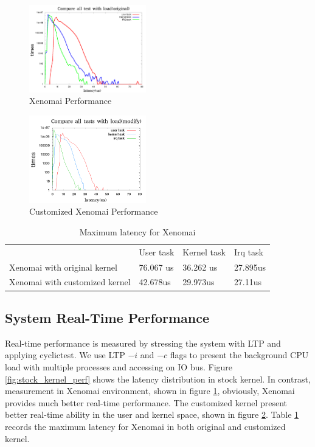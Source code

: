 \documentclass[conference]{IEEEtran}
\begin{document}
\begin{figure}	
	\centering
	\includegraphics[width=2in]{img/xenomai_load.png}
	\caption{Xenomai Performance}
	\label{fig:xeno_perf}
\end{figure}

\begin{figure}
	\centering
	\includegraphics[width=2in]{img/xenomai_load_modify.png}
	\caption{Customized Xenomai Performance}
	\label{fig:xeno_perf_modify}
\end{figure}

\begin{table}[]
\centering
\caption{Maximum latency for Xenomai}
\label{xeno_compare}
\begin{tabular}{llll}
                              & User task & Kernel task & Irq task \\
Xenomai with original kernel  & 76.067 us & 36.262 us   & 27.895us \\
Xenomai with customized kernel & 42.678us  & 29.973us    & 27.11us 
\end{tabular}
\end{table}

\subsection{System Real-Time Performance}

Real-time performance is measured by stressing the system with LTP and applying cyclictest. We use LTP $-i$ and $-c$ flags to present the background CPU load with multiple processes and accessing on IO bus. Figure \ref{fig:stock_kernel_perf} shows the latency distribution in stock kernel. In contrast, measurement in Xenomai environment, shown in figure \ref{fig:xeno_perf}, obviously, Xenomai provides much better real-time performance. The customized kernel present better real-time ability in the user and kernel space, shown in figure \ref{fig:xeno_perf_modify}. Table \ref{xeno_compare} records the maximum latency for Xenomai in both original and customized kernel.
\end{document}
